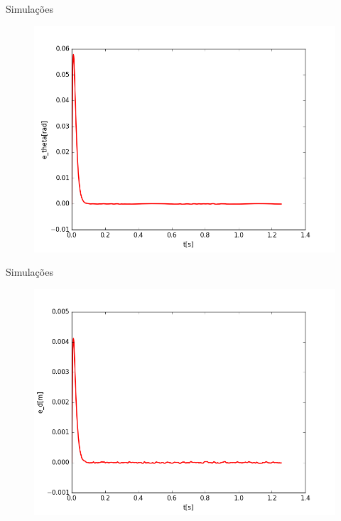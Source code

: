 \documentclass[25pt,landscape]{beamer}
\begin{document}
\begin{frame}{Simula\c{c}\~oes}
	\begin{figure}[!h]
        \centering
        \includegraphics[scale=0.45]{Python/e_theta.png}
    \end{figure}
\end{frame}

\begin{frame}{Simula\c{c}\~oes}
	\begin{figure}[!h]
        \centering
        \includegraphics[scale=0.45]{Python/e_d.png}
    \end{figure}
\end{frame}
\end{document}

